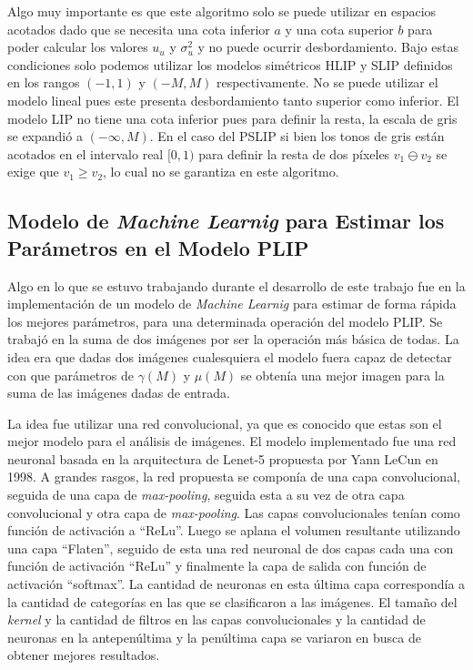 Algo muy importante es que este algoritmo solo se puede utilizar en espacios acotados dado que se necesita una cota inferior $a$ y una cota superior $b$ para poder calcular los valores $u_u$ y $\sigma_u^2$ y no puede ocurrir desbordamiento. Bajo estas condiciones solo podemos utilizar los modelos sim\'etricos HLIP y SLIP definidos en los rangos $(-1,1)$ y $(- M, M)$ respectivamente. No se puede utilizar el modelo lineal pues este presenta desbordamiento tanto superior como inferior. El modelo LIP no tiene una cota inferior pues para definir la resta, la escala de gris se expandi\'o a $(-\infty,M)$. En el caso del PSLIP si bien los tonos de gris est\'an acotados en el intervalo real $[0,1)$ para definir la resta de dos p\'ixeles $v_1\ominus v_2$ se exige que $v_1\geq v_2$, lo cual no se garantiza en este algoritmo.

\subsection{Modelo de \textit{Machine Learnig} para Estimar los Par\'ametros en el Modelo PLIP}

Algo en lo que se estuvo trabajando durante el desarrollo de este trabajo fue en la implementaci\'on de un modelo de \textit{Machine Learnig} para estimar de forma r\'apida los mejores par\'ametros, para una determinada operaci\'on del modelo PLIP. Se trabaj\'o en la suma de dos im\'agenes por ser la operaci\'on m\'as b\'asica de todas. La idea era que dadas dos im\'agenes cualesquiera el modelo fuera capaz de detectar con que par\'ametros de $\gamma(M)$ y $\mu(M)$ se obten\'ia una mejor imagen para la suma de las im\'agenes dadas de entrada.

La idea fue utilizar una red convolucional, ya que es conocido que estas son el mejor modelo para el an\'alisis de im\'agenes. El modelo implementado fue una red neuronal basada en la arquitectura de Lenet-5 propuesta por Yann LeCun en 1998. A grandes rasgos, la red propuesta se compon\'ia de una capa convolucional, seguida de una capa de \textit{max-pooling}, seguida esta a su vez de otra capa convolucional y otra capa de \textit{max-pooling}. Las capas convolucionales ten\'ian como funci\'on de activaci\'on a ``ReLu''. Luego se aplana el volumen resultante utilizando una capa ``Flaten'', seguido de esta una red neuronal de dos capas cada una con funci\'on de activaci\'on ``ReLu'' y finalmente la capa de salida con funci\'on de activaci\'on ``softmax''. La cantidad de neuronas en esta \'ultima capa correspond\'ia a la cantidad de categor\'ias en las que se clasificaron a las im\'agenes. El tama\~no del \textit{kernel} y la cantidad de filtros en las capas convolucionales y la cantidad de neuronas en la antepen\'ultima y la pen\'ultima capa se variaron en busca de obtener mejores resultados.

